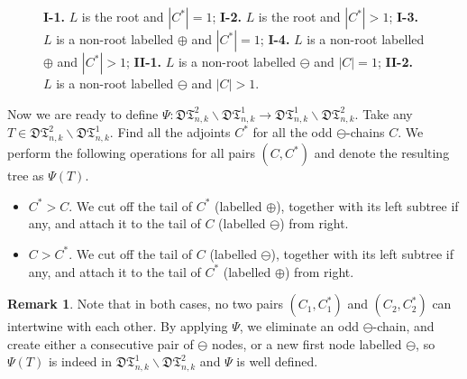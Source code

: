 \documentclass[12pt]{amsart}
\numberwithin{equation}{section}
\theoremstyle{plain}
\theoremstyle{definition}
\newtheorem{remark}[theorem]{Remark}
\def\D{\mathfrak{D}}
\def\T{\mathfrak{T}}
\begin{document}
\begin{figure}
\caption{{\bf I-1.} $L$ is the root and $|C^*|=1$; {\bf I-2.} $L$ is the root and $|C^*|>1$; {\bf I-3.} $L$ is a non-root labelled $\oplus$  and $|C^*|=1$; {\bf I-4.} $L$ is a non-root labelled $\oplus$  and $|C^*|>1$; {\bf II-1.} $L$ is a non-root labelled  $\ominus$  and $|C|=1$; {\bf II-2.} $L$ is a non-root labelled $\ominus$  and $|C|>1$.}
\label{findadj}
\end{figure}


Now we are ready to define $\Psi:\D\T^{2}_{n,k}\backslash \D\T^{1}_{n,k}\rightarrow\D\T^{1}_{n,k}\backslash \D\T^{2}_{n,k}$. Take any $T\in \D\T^{2}_{n,k}\backslash \D\T^{1}_{n,k}$. Find all the adjoints $C^*$ for all the odd $\ominus$-chains $C$. We perform the following operations for all pairs $(C,C^*)$ and denote the resulting tree as $\Psi(T)$.


 

 
\begin{itemize}
\item[Case I:] $C^*>C$. We cut off the tail of $C^*$ (labelled $\oplus$), together with its left subtree if any, and attach it to the tail of $C$ (labelled $\ominus$) from right.
\item[Case II:] $C>C^*$. We cut off the tail of $C$ (labelled $\ominus$), together with its left subtree if any, and attach it to the tail of $C^*$ (labelled $\oplus$) from right.
\end{itemize}

\begin{remark}
Note that in both cases, no two pairs $(C_1,C_1^{*})$ and $(C_2,C_2^{*})$ can intertwine with each other. By applying $\Psi$, we eliminate an odd $\ominus$-chain, and create either a consecutive pair of $\ominus$ nodes, or a new first node labelled $\ominus$, so $\Psi(T)$ is indeed in $\D\T^{1}_{n,k}\backslash \D\T^{2}_{n,k}$ and $\Psi$ is well defined. 
\end{remark}
\end{document}
